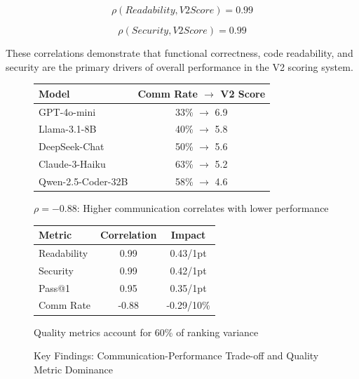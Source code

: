 \documentclass[conference]{IEEEtran}
\begin{document}
\begin{equation}
    \mathit{\rho}(\mathit{Readability}, \mathit{V2Score}) = 0.99
\end{equation}

\begin{equation}
    \mathit{\rho}(\mathit{Security}, \mathit{V2Score}) = 0.99
\end{equation}

These correlations demonstrate that functional correctness, code readability, and security are the primary drivers of overall performance in the V2 scoring system.

\begin{figure}[ht]
    \centering
    \begin{minipage}{0.45\textwidth}
        \centering
        \small
        \caption{Communication Rate vs V2 Score Trade-off}
        \label{fig:comm_tradeoff}
        \begin{tabular}{lc}
            \toprule
            Model & Comm Rate $\rightarrow$ V2 Score \\
            \midrule
            GPT-4o-mini & 33\% $\rightarrow$ 6.9 \\
            Llama-3.1-8B & 40\% $\rightarrow$ 5.8 \\
            DeepSeek-Chat & 50\% $\rightarrow$ 5.6 \\
            Claude-3-Haiku & 63\% $\rightarrow$ 5.2 \\
            Qwen-2.5-Coder-32B & 58\% $\rightarrow$ 4.6 \\
            \bottomrule
        \end{tabular}
        \vspace{0.5em}
        {\small $\rho = -0.88$: Higher communication correlates with lower performance}
    \end{minipage}
    \hfill
    \begin{minipage}{0.45\textwidth}
        \centering
        \small
        \caption{Code Quality Dominance in Rankings}
        \label{fig:quality_dominance}
        \begin{tabular}{lcc}
            \toprule
            Metric & Correlation & Impact \\
            \midrule
            Readability & 0.99 & 0.43/1pt \\
            Security & 0.99 & 0.42/1pt \\
            Pass@1 & 0.95 & 0.35/1pt \\
            Comm Rate & -0.88 & -0.29/10\% \\
            \bottomrule
        \end{tabular}
        \vspace{0.5em}
        {\small Quality metrics account for 60\% of ranking variance}
    \end{minipage}
    \caption{Key Findings: Communication-Performance Trade-off and Quality Metric Dominance}
    \label{fig:key_findings}
\end{figure}
\end{document}
